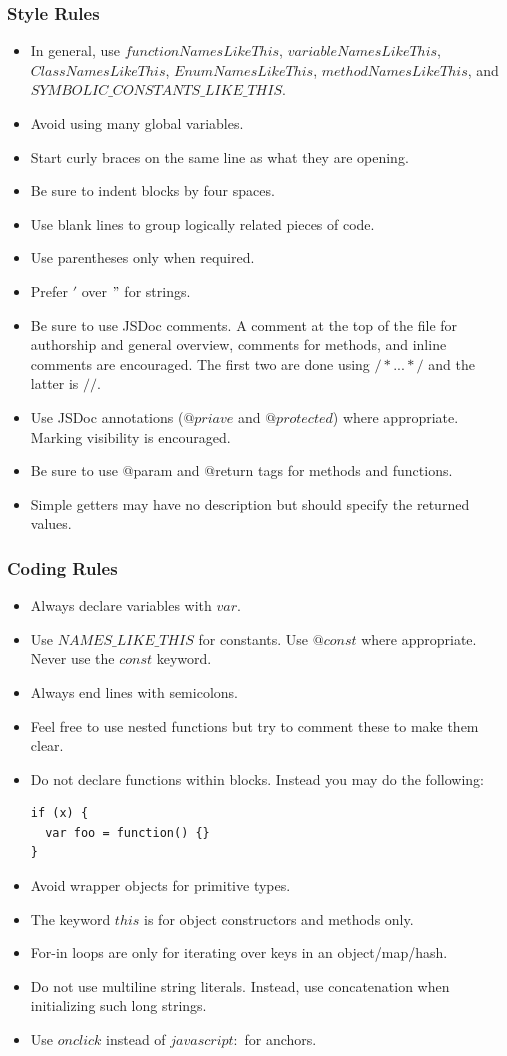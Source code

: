 \documentclass[12pt]{article}
\begin{document}
\subsubsection{Style Rules}
\begin{itemize}
\item In general, use $functionNamesLikeThis$, $variableNamesLikeThis$, $ClassNamesLikeThis$, $EnumNamesLikeThis$, $methodNamesLikeThis$, and $SYMBOLIC\_CONSTANTS\_LIKE\_THIS$.
\item Avoid using many global variables.
\item Start curly braces on the same line as what they are opening.
\item Be sure to indent blocks by four spaces.
\item Use blank lines to group logically related pieces of code.
\item Use parentheses only when required.
\item Prefer $'$ over $"$ for strings.
\item Be sure to use JSDoc comments.  A comment at the top of the file for authorship and general overview, comments for methods, and inline comments are encouraged.  The first two are done using $/*. . . */$ and the latter is $//$.
\item Use JSDoc annotations ($@priave$ and $@protected$) where appropriate.  Marking visibility is encouraged.
\item Be sure to use @param and @return tags for methods and functions.
\item Simple getters may have no description but should specify the returned values.
\end{itemize}

\subsubsection{Coding Rules}
\begin{itemize}
\item Always declare variables with $var$.
\item Use $NAMES\_LIKE\_THIS$ for constants. Use $@const$ where appropriate. Never use the $const$ keyword. 
\item Always end lines with semicolons.
\item Feel free to use nested functions but try to comment these to make them clear.
\item Do not declare functions within blocks.  Instead you may do the following:
\begin{verbatim}
if (x) {
  var foo = function() {}
}
\end{verbatim}
\item Avoid wrapper objects for primitive types.
\item The keyword $this$ is for object constructors and methods only.
\item For-in loops are only for iterating over keys in an object/map/hash.
\item Do not use multiline string literals.  Instead, use concatenation when initializing such long strings.
\item Use $onclick$ instead of $javascript:$ for anchors.
\end{itemize}
\end{document}
